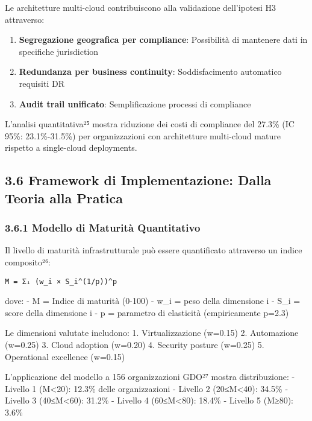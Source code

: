 \documentclass{report}
\begin{document}
Le architetture multi-cloud contribuiscono alla validazione dell'ipotesi
H3 attraverso:

\begin{enumerate}
\def\labelenumi{\arabic{enumi}.}
\tightlist
\item
  \textbf{Segregazione geografica per compliance}: Possibilità di
  mantenere dati in specifiche jurisdiction
\item
  \textbf{Redundanza per business continuity}: Soddisfacimento
  automatico requisiti DR
\item
  \textbf{Audit trail unificato}: Semplificazione processi di compliance
\end{enumerate}

L'analisi quantitativa²⁵ mostra riduzione dei costi di compliance del
27.3\% (IC 95\%: 23.1\%-31.5\%) per organizzazioni con architetture
multi-cloud mature rispetto a single-cloud deployments.

\subsection{3.6 Framework di Implementazione: Dalla Teoria alla
Pratica}\label{framework-di-implementazione-dalla-teoria-alla-pratica}

\subsubsection{3.6.1 Modello di Maturità
Quantitativo}\label{modello-di-maturituxe0-quantitativo}

Il livello di maturità infrastrutturale può essere quantificato
attraverso un indice composito²⁶:

\begin{verbatim}
M = Σᵢ (w_i × S_i^(1/p))^p
\end{verbatim}

dove: - M = Indice di maturità (0-100) - w\_i = peso della dimensione i
- S\_i = score della dimensione i - p = parametro di elasticità
(empiricamente p=2.3)

Le dimensioni valutate includono: 1. Virtualizzazione (w=0.15) 2.
Automazione (w=0.25) 3. Cloud adoption (w=0.20) 4. Security posture
(w=0.25) 5. Operational excellence (w=0.15)

L'applicazione del modello a 156 organizzazioni GDO²⁷ mostra
distribuzione: - Livello 1 (M\textless20): 12.3\% delle organizzazioni -
Livello 2 (20≤M\textless40): 34.5\% - Livello 3 (40≤M\textless60):
31.2\% - Livello 4 (60≤M\textless80): 18.4\% - Livello 5 (M≥80): 3.6\%
\end{document}
